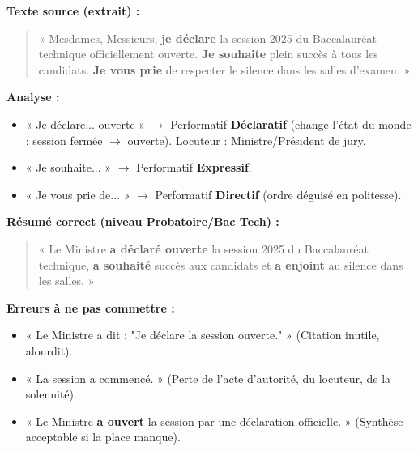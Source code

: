 \documentclass[11pt]{article}
\begin{document}
\begin{exoresolu}
\textbf{Texte source (extrait) :}
\begin{quote}
« Mesdames, Messieurs, \textbf{je déclare} la session 2025 du Baccalauréat technique officiellement ouverte. \textbf{Je souhaite} plein succès à tous les candidats. \textbf{Je vous prie} de respecter le silence dans les salles d'examen. »
\end{quote}

\textbf{Analyse :}
\begin{itemize}
    \item « Je déclare... ouverte » $\rightarrow$ Performatif \textbf{Déclaratif} (change l'état du monde : session fermée $\rightarrow$ ouverte). Locuteur : Ministre/Président de jury.
    \item « Je souhaite... » $\rightarrow$ Performatif \textbf{Expressif}.
    \item « Je vous prie de... » $\rightarrow$ Performatif \textbf{Directif} (ordre déguisé en politesse).
\end{itemize}
\tcblower
\textbf{Résumé correct (niveau Probatoire/Bac Tech) :}
\begin{quote}
« Le Ministre \textbf{a déclaré ouverte} la session 2025 du Baccalauréat technique, \textbf{a souhaité} succès aux candidats et \textbf{a enjoint} au silence dans les salles. »
\end{quote}

\textbf{Erreurs à ne pas commettre :}
\begin{itemize}
    \item[\textbf{×}] « Le Ministre a dit : "Je déclare la session ouverte." » (Citation inutile, alourdit).
    \item[\textbf{×}] « La session a commencé. » (Perte de l'acte d'autorité, du locuteur, de la solennité).
    \item[\textbf{✓}] « Le Ministre \textbf{a ouvert} la session par une déclaration officielle. » (Synthèse acceptable si la place manque).
\end{itemize}
\end{exoresolu}
\end{document}
